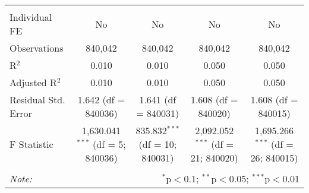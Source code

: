 \documentclass[
]{article}
\begin{document}
\begin{table}[!htbp]
{\begin{tabular}{@{\extracolsep{5pt}}lcccc}
\hline \\[-1.8ex] 
Individual FE & No & No & No & No \\ 
Observations & 840,042 & 840,042 & 840,042 & 840,042 \\ 
R$^{2}$ & 0.010 & 0.010 & 0.050 & 0.050 \\ 
Adjusted R$^{2}$ & 0.010 & 0.010 & 0.050 & 0.050 \\ 
Residual Std. Error & 1.642 (df = 840036) & 1.641 (df = 840031) & 1.608 (df = 840020) & 1.608 (df = 840015) \\ 
F Statistic & 1,630.041$^{***}$ (df = 5; 840036) & 835.832$^{***}$ (df = 10; 840031) & 2,092.052$^{***}$ (df = 21; 840020) & 1,695.266$^{***}$ (df = 26; 840015) \\ 
\hline 
\hline \\[-1.8ex] 
\textit{Note:}  & \multicolumn{4}{r}{$^{*}$p$<$0.1; $^{**}$p$<$0.05; $^{***}$p$<$0.01} \\ 
\end{tabular}
} 
\end{table} 
\newpage
\end{document}
